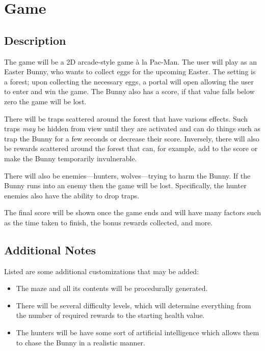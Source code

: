 \documentclass{article}
\begin{document}
\section{Game}

\subsection{Description}

The game will be a 2D arcade-style game à la Pac-Man.
The user will play as an Easter Bunny, who wants to collect eggs for the
upcoming Easter.
The setting is a forest; upon collecting the necessary eggs, a portal will open
allowing the user to enter and win the game.
The Bunny also has a score, if that value falls below zero the game will be
lost.

There will be traps scattered around the forest that have various effects.
Such traps \textit{may} be hidden from view until they are activated and can do
things such as trap the Bunny for a few seconds or decrease their score.
Inversely, there will also be rewards scattered around the forest that can, for
example, add to the score or make the Bunny temporarily invulnerable.

There will also be enemies—hunters, wolves—trying to harm the Bunny.
If the Bunny runs into an enemy then the game will be lost.
Specifically, the hunter enemies also have the ability to drop traps.

The final score will be shown once the game ends and will have many factors such
as the time taken to finish, the bonus rewards collected, and more.

\subsection{Additional Notes}

Listed are some additional customizations that may be added:

\begin{itemize}
\item The maze and all its contents will be procedurally generated.
\item
    There will be several difficulty levels, which will determine everything
    from the number of required rewards to the starting health value.
\item
    The hunters will be have some sort of artificial intelligence which allows
    them to chase the Bunny in a realistic manner.
\end{itemize}
\end{document}
